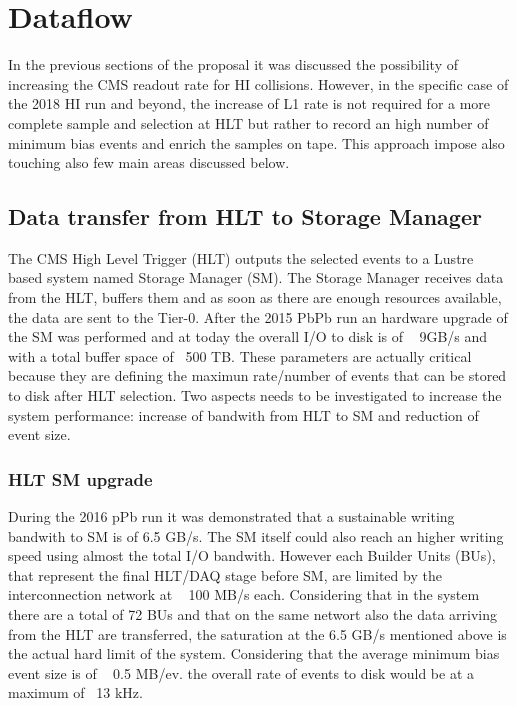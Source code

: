 \newpage

\section{Dataflow\label{sec:dataflow}}
In the previous sections of the proposal it was discussed the possibility of increasing the CMS readout rate for HI collisions. However, in the specific case of the 2018 HI run and beyond, the increase of L1 rate is not required for a more complete sample and selection at HLT but rather to record an high number of minimum bias events and enrich the samples on tape. This approach impose also touching also few main areas discussed below.


\subsection{Data transfer from HLT to Storage Manager\label{subsec:hltSM}}
The CMS High Level Trigger (HLT) outputs the selected events to a Lustre based system named Storage Manager (SM). The Storage Manager receives data from the HLT, buffers them and as soon as there are enough resources available, the data are sent to the Tier-0.  
After the 2015 PbPb run an hardware upgrade of the SM was performed and at today the overall I/O to disk is of ~ 9GB/s and with a total buffer space of ~500 TB. These parameters are actually critical because they are defining the maximun rate/number of events that can be stored to disk after HLT selection. Two aspects needs to be investigated to increase the system performance: increase of bandwith from HLT to SM and  reduction of event size.

\subsubsection{HLT SM upgrade\label{subsec:hltSMupgrade}}
During the 2016 pPb run it was demonstrated that a sustainable writing bandwith to SM is of 6.5 GB/s. The SM itself could also reach an higher writing speed using almost the total I/O bandwith. However each Builder Units (BUs), that represent the final HLT/DAQ stage before SM,  are limited by the interconnection network at ~ 100 MB/s each. Considering that in the system there are a total of 72 BUs and that on the same networt also the data arriving from the HLT are transferred, the saturation at the 6.5 GB/s mentioned above is the actual hard limit of the system. Considering that the average minimum bias event size is of ~ 0.5 MB/ev. the overall rate of events to disk would be at a maximum of ~13 kHz. 

